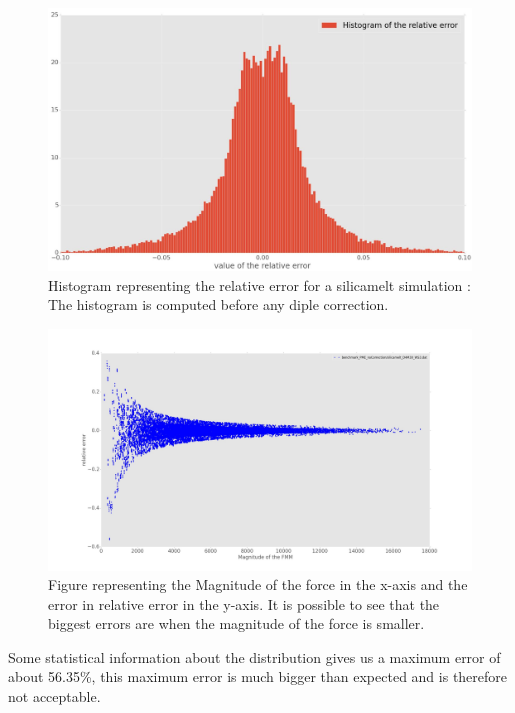 \documentclass[10pt,twoside,a4paper]{report}
\begin{document}
\begin{figure}[H]
  \label{hist_correction} 
   \includegraphics[scale=0.25]{hist_nocorrection.jpeg}
   
    \centering 
    \caption{Histogram representing the relative error for a silicamelt simulation : The histogram is computed before any diple correction.}   
  
   \end{figure}   


	\begin{figure}[H]
	   \includegraphics[scale=0.2]{magErr_noCorrection.jpeg}
    \centering 
    \caption{Figure representing the Magnitude of the force in the x-axis and the  error in relative error in the y-axis. It is possible to see that the biggest errors are when the magnitude of the force is smaller.}    
   \end{figure}  


	Some statistical information about the distribution gives us a maximum error of about 56.35\%, this maximum error is much bigger than expected and is therefore not acceptable.\\
	
\end{document}
